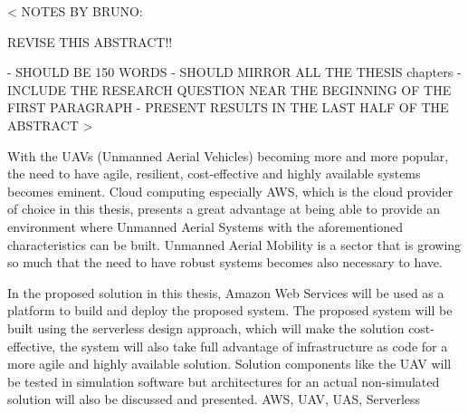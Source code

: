 \cleardoublepage
<
NOTES BY BRUNO:

REVISE THIS ABSTRACT!!

- SHOULD BE 150 WORDS
- SHOULD MIRROR ALL THE THESIS chapters
- INCLUDE THE RESEARCH QUESTION NEAR THE BEGINNING OF THE FIRST PARAGRAPH
- PRESENT RESULTS IN THE LAST HALF OF THE ABSTRACT
>

\abstract
With the UAVs (Unmanned Aerial Vehicles) becoming more and more popular, the need to have agile, resilient, cost-effective and highly available systems becomes eminent. Cloud computing especially AWS, which is the cloud provider of choice in this thesis, presents a great advantage at being able to provide an environment where Unmanned Aerial Systems with the aforementioned characteristics can be built. Unmanned Aerial Mobility is a sector that is growing so much that the need to have robust systems becomes also necessary to have.

In the proposed solution in this thesis, Amazon Web Services will be used as a platform to build and deploy the proposed system. The proposed system will be built using the serverless design approach, which will make the solution cost-effective, the system will also take full advantage of infrastructure as code for a more agile and highly available solution. Solution components like the UAV will be tested in simulation software but architectures for an actual non-simulated solution will also be discussed and presented.
\keywords AWS, UAV, UAS, Serverless